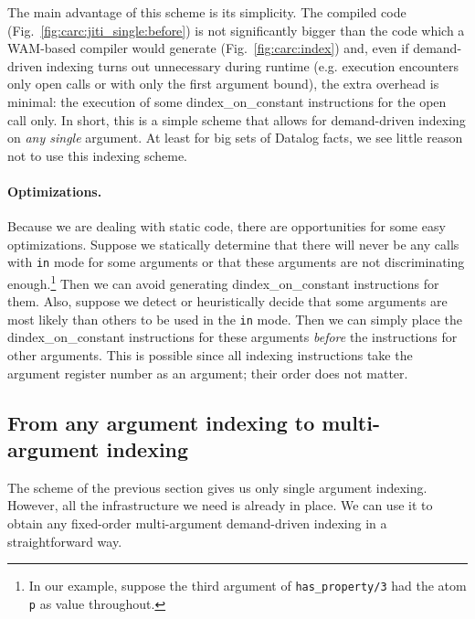 \documentclass{llncs}
\newcommand{\code}[1]{\texttt{#1}}
\newcommand{\instr}[1]{\textsf{#1}}
\newcommand{\jitiONconstant}{\mbox{\instr{dindex\_on\_constant}}\xspace}
\newcommand{\JITI}{demand-driven indexing\xspace}
\begin{document}
The main advantage of this scheme is its simplicity. The compiled code
(Fig.~\ref{fig:carc:jiti_single:before}) is not significantly bigger
than the code which a WAM-based compiler would generate
(Fig.~\ref{fig:carc:index}) and, even if \JITI turns out unnecessary
during runtime (e.g. execution encounters only open calls or with only
the first argument bound), the extra overhead is minimal: the
execution of some \jitiONconstant instructions for the open call only.
%
In short, this is a simple scheme that allows for \JITI on \emph{any
single} argument. At least for big sets of Datalog facts, we see
little reason not to use this indexing scheme.

\paragraph*{Optimizations.}
Because we are dealing with static code, there are opportunities for
some easy optimizations. Suppose we statically determine that there
will never be any calls with \code{in} mode for some arguments or that
these arguments are not discriminating enough.\footnote{In our example,
suppose the third argument of \code{has\_property/3} had the atom
\code{p} as value throughout.} Then we can avoid generating
\jitiONconstant instructions for them. Also, suppose we detect or
heuristically decide that some arguments are most likely than others
to be used in the \code{in} mode. Then we can simply place the
\jitiONconstant instructions for these arguments \emph{before} the
instructions for other arguments. This is possible since all indexing
instructions take the argument register number as an argument; their
order does not matter.

\subsection{From any argument indexing to multi-argument indexing}
The scheme of the previous section gives us only single argument
indexing. However, all the infrastructure we need is already in place.
We can use it to obtain any fixed-order multi-argument \JITI in a
straightforward way.
\end{document}
